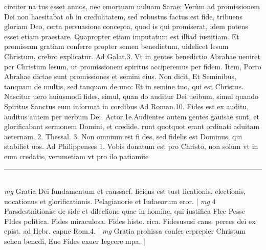 \documentclass{article}
\begin{document}
\begin{pages}
circiter na tus esset annos, nec emortuam uuluam Sarae: Verùm ad promissionem Dei non haesitabat ob in credulitatem, sed robustus factus est fide, tribuens gloriam Deo, certa persuasione concepta, quod is qui promiserat, idem potens esset etiam praestare. Quapropter etiam imputatum est illiad iustitiam. Et promissam gratiam conferre propter semen benedictum, uidelicet lesum Christum, crebro explicatur. Ad Galat.3. Vt in gentes benedictio Abrahae ueniret per Christum lesum, ut promissionem spiritus acciperemus per fidem. Item, Porro Abrahae dictae sunt promissiones et semini eius. Non dicit, Et Seminibus, tanquam de multis, sed tanquam de uno: Et in semine tuo, qui est Christus. Nascitur uero huiusmodi fides, simul, quan do auditur Dei ueibum, simul quando Spiritus Sanctus eum informat in cordibus Ad Roman.10. Fides est ex auditu, auditus autem per uerbum Dei. Actor.1e.Audientes autem gentes gauisae sunt, et glorificabant sermonem Domini, et credide. runt quotquot erant ordinati aduitam aeternam. 2. Thessal. 3. Non omnium est fi des, sed fidelis est Dominus, qui stabiliet uos. Ad Philippenses 1. Vobis donatum est pro Christo, non solum vt in eum credatis, verumetiam vt pro ilo patiamiie  \pend
\vspace{0.5cm}\noindent
\vspace{0.2cm}\rule{1cm}{0.2pt}\\ 
\hspace{0.2cm}\textit{mg}
\footnotesize Gratia Dei fundamentum et caussacf. ficiens est tust ficationis, electionis, uocationus et glorificationis. Pelagianorie et Iudaeorum eror. 
\normalsize| 
\hspace{0.2cm}\textit{mg}
\footnotesize 4 Parsdestnitionis: de side et dileclione quae in homine, qui iustifica Flee Pesse FIdes politica. Fides miraculosa. Fides histo. rica. Fidesususi cans. perces dei ex epist. ad Hebr. capne Rom.4. 
\normalsize| 
\hspace{0.2cm}\textit{mg}
\footnotesize Gratia prohissa confer erprepier Christum sehen bencdi, Eue Fides exuer Iegcere mpa. 
\normalsize| 

\end{pages}
\end{document}
